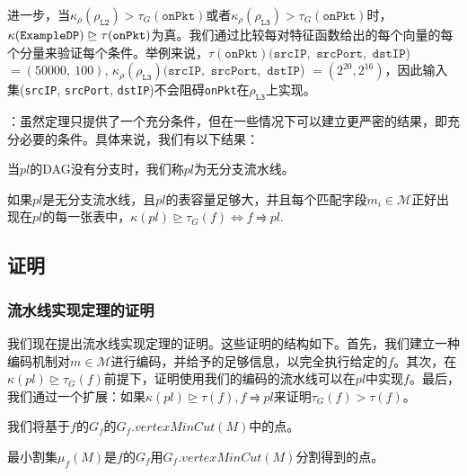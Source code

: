 进一步，当$\kappa_\rho(\rho_{\texttt{L2}}) > \tau_G(\texttt{onPkt})$或者$\kappa_\rho(\rho_{\texttt{L3}}) > \tau_G(\texttt{onPkt})$时，$\kappa(\texttt{ExampleDP}) \trianglerighteq \tau(\texttt{onPkt})$为真。我们通过比较每对特征函数给出的每个向量的每个分量来验证每个条件。举例来说，$\tau(\texttt{onPkt})(\texttt{srcIP},$ $\texttt{srcPort},$ $\texttt{dstIP}$) $ = (50000,\ 100)$,  $\kappa_\rho(\rho_{\texttt{L3}})(\texttt{srcIP},$ $\texttt{srcPort},$ $\texttt{dstIP}$) $ = (2^{20}, 2^{16})$，因此输入集(\texttt{srcIP}, \texttt{srcPort}, \texttt{dstIP})不会阻碍\texttt{onPkt}在$\rho_{\texttt{L3}}$上实现。




：虽然定理只提供了一个充分条件，但在一些情况下可以建立更严密的结果，即充分必要的条件。具体来说，我们有以下结果：

\begin{definition} 当$pl$的DAG没有分支时，我们称$pl$为无分支流水线。
\end{definition}

\begin{theorem}[无分支流水线实现定理] 如果$pl$是无分支流水线，且$pl$的表容量足够大，并且每个匹配字段$m_i \in \mathcal{M}$正好出现在$pl$的每一张表中，$\kappa(pl) \trianglerighteq \tau_G(f) \Leftrightarrow f \rightrightharpoons pl$.
\end{theorem}





\subsection{证明}

\subsubsection{流水线实现定理的证明}

我们现在提出流水线实现定理的证明。这些证明的结构如下。首先，我们建立一种编码机制对$m \in \mathcal{M}$进行编码，并给予的足够信息，以完全执行给定的$f$。其次，在$\kappa(pl) \trianglerighteq \tau_G(f)$前提下，证明使用我们的编码的流水线可以在$pl$中实现$f$。最后，我们通过一个扩展：如果$\kappa(pl) \trianglerighteq \tau(f), f \rightrightharpoons pl$来证明$\tau_G(f) > \tau(f)$。

我们将基于$f$的$G_f$的$G_f.vertexMinCut(M)$中的点。

\begin{definition}
最小割集$\mu_f(M)$是$f$的$G_f$用$G_f.vertexMinCut(M)$分割得到的点。
\end{definition}

